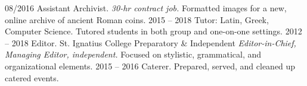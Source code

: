 \begin{entrylist}
	\entry
    		{08/2016}
    		{Assistant Archivist.}
    		{\grinnell}
    		{\emph{30-hr contract job.} Formatted images for a new, online archive of ancient Roman coins.}
    \entry
    		{2015 -- 2018}
    		{Tutor: Latin, Greek, Computer Science.}
    		{\grinnell}
    		{Tutored students in both group and one-on-one settings.}
    \entry
    		{2012 -- 2018}
    		{Editor.}
    		{St. Ignatius College Preparatory \& Independent}
    		{\emph{Editor-in-Chief, Managing Editor, independent.} Focused on stylistic, grammatical, and organizational elements.}
    \entry
    		{2015 -- 2016}
    		{Caterer.}
    		{\grinnell}
    		{Prepared, served, and cleaned up catered events.}
\end{entrylist}
